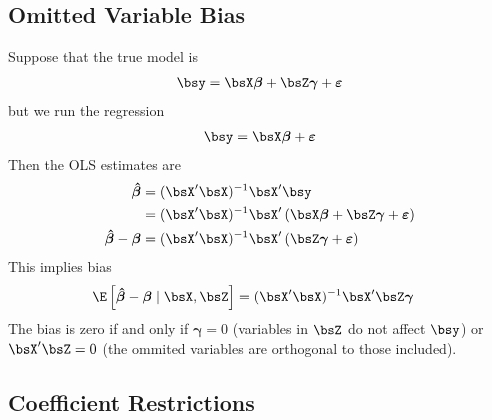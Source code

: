 \documentclass[12pt]{article}
\theoremstyle{plain}
\theoremstyle{definition}
\theoremstyle{remark}
\newcommand{\bsvarepsilon}{\boldsymbol{\varepsilon}}
\newcommand{\bsbeta}{\boldsymbol{\beta}}
\newcommand{\bsgamma}{\boldsymbol{\gamma}}
\newcommand{\bshatbeta}{\boldsymbol{\hat{\beta}}}
\begin{document}
\clearpage
\subsection{Omitted Variable Bias}

Suppose that the true model is
\begin{align*}
  \bsy = \bsX\bsbeta + \bsZ \bsgamma + \bsvarepsilon
\end{align*}
but we run the regression
\begin{align*}
  \bsy = \bsX\bsbeta + \bsvarepsilon
\end{align*}
Then the OLS estimates are
\begin{align*}
  \bshatbeta
  &= (\bsX'\bsX)^{-1}\bsX' \bsy \\
  &= (\bsX'\bsX)^{-1}\bsX'
    \left(\bsX\bsbeta + \bsZ \bsgamma + \bsvarepsilon\right) \\
  \bshatbeta - \bsbeta
  &= (\bsX'\bsX)^{-1}\bsX'
    \left(\bsZ \bsgamma + \bsvarepsilon\right)
\end{align*}
This implies bias
\begin{align*}
  \E\left[\bshatbeta - \bsbeta\;|\;\bsX,\bsZ\right]
  &= (\bsX'\bsX)^{-1} \bsX'\bsZ \bsgamma
\end{align*}
The bias is zero if and only if $\bsgamma=0$ (variables in $\bsZ$ do not
affect $\bsy$) or $\bsX'\bsZ=0$ (the ommited variables are orthogonal to
those included).



\clearpage
\subsection{Coefficient Restrictions}
\end{document}
